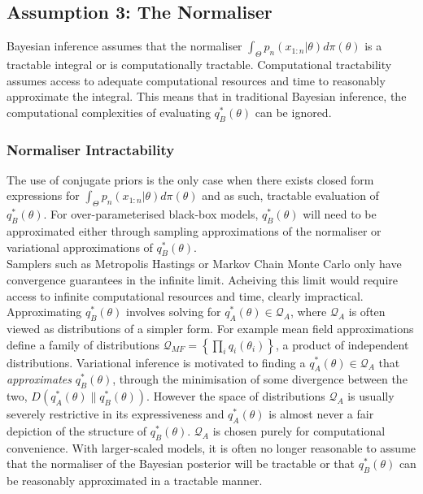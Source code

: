 \documentclass[twoside,11pt]{article}
\begin{document}
\subsection{Assumption 3: The Normaliser}

Bayesian inference assumes that the normaliser $\int_{\Theta} p_n(x_{1:n}|\theta) d \pi(\theta)$ is a tractable integral or is computationally tractable. Computational tractability assumes access to  adequate computational resources and time to reasonably approximate the integral. This means that in traditional Bayesian inference, the computational complexities of evaluating $q_B^*(\theta)$ can be ignored. 
\subsubsection{Normaliser Intractability}
The use of conjugate priors is the only case when there exists closed form expressions for $\int_{\Theta} p_n(x_{1:n}|\theta) d \pi(\theta)$ and as such, tractable evaluation of $q_B^*(\theta)$. For over-parameterised black-box models, $q_B^*(\theta)$ will need to be approximated either through sampling approximations of the normaliser or variational approximations of $q_B^*(\theta)$. \\
\newline 
Samplers such as Metropolis Hastings or Markov Chain Monte Carlo only have convergence guarantees in the infinite limit. Acheiving this limit would require access to infinite computational resources and time, clearly impractical. \\
\newline
Approximating $q_B^*(\theta)$ involves solving for $q_A^*(\theta) \in \mathcal{Q}_{A}$, where $\mathcal{Q}_{A}$ is often viewed as distributions of a simpler form. For example mean field approximations define a family of distributions $\mathcal{Q}_{MF} = \left\{\prod_i q_i(\theta_i)\right\}$, a product of independent distributions. Variational inference is motivated to finding a $q_A^*(\theta) \in \mathcal{Q}_{A}$ that \textit{approximates} $q_B^*(\theta)$, through the minimisation of some divergence between the two, $D(q_A^*(\theta)\| q_B^*(\theta))$. However the space of distributions $\mathcal{Q}_{A}$ is usually severely restrictive in its expressiveness and $q_A^*(\theta)$ is almost never a fair depiction of the structure of $q_B^*(\theta)$. $\mathcal{Q}_{A}$ is chosen purely for computational convenience. With larger-scaled models, it is often no longer reasonable to assume that the normaliser of the Bayesian posterior will be tractable or that $q_B^*(\theta)$ can be reasonably approximated in a tractable manner.
\end{document}

